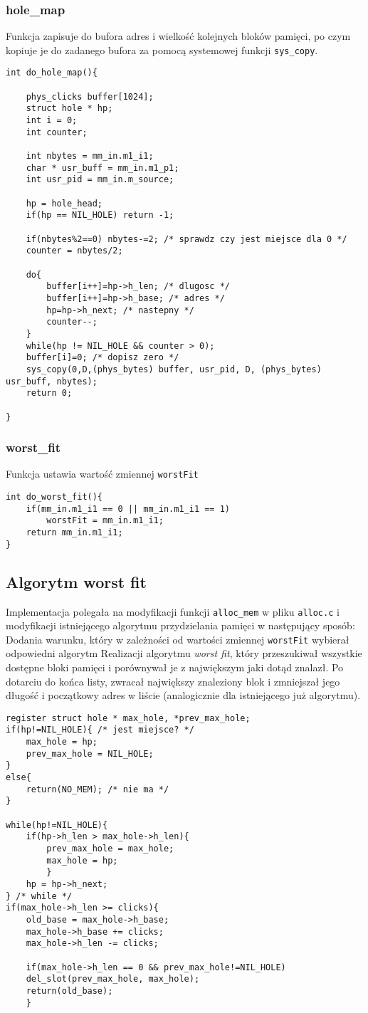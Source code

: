 \documentclass[12pt,a4paper]{article}
\begin{document}
\subsubsection{hole\_map}
Funkcja zapisuje do bufora adres i wielkość kolejnych bloków pamięci, po czym kopiuje je do zadanego bufora za pomocą systemowej funkcji \texttt{sys\_copy}.
\begin{verbatim}
int do_hole_map(){

	phys_clicks buffer[1024];
	struct hole * hp;
	int i = 0;
	int counter; 

	int nbytes = mm_in.m1_i1;
	char * usr_buff = mm_in.m1_p1;
	int usr_pid = mm_in.m_source;

	hp = hole_head;
	if(hp == NIL_HOLE) return -1;

	if(nbytes%2==0) nbytes-=2; /* sprawdz czy jest miejsce dla 0 */
	counter = nbytes/2;

	do{
		buffer[i++]=hp->h_len; /* dlugosc */
		buffer[i++]=hp->h_base; /* adres */
		hp=hp->h_next; /* nastepny */
		counter--;
	}
	while(hp != NIL_HOLE && counter > 0);
	buffer[i]=0; /* dopisz zero */
	sys_copy(0,D,(phys_bytes) buffer, usr_pid, D, (phys_bytes) usr_buff, nbytes);
	return 0;

}
\end{verbatim}
\subsubsection{worst\_fit} 
Funkcja ustawia wartość zmiennej \texttt{worstFit}
\begin{verbatim}
int do_worst_fit(){
	if(mm_in.m1_i1 == 0 || mm_in.m1_i1 == 1)
		worstFit = mm_in.m1_i1;
	return mm_in.m1_i1;
}
\end{verbatim}
\subsection{Algorytm worst fit}
Implementacja polegała na modyfikacji funkcji \texttt{alloc\_mem} w pliku \texttt{alloc.c} i modyfikacji istniejącego algorytmu przydzielania pamięci w następujący sposób:
Dodania warunku, który w zależności od wartości zmiennej \texttt{worstFit} wybierał odpowiedni algorytm
Realizacji algorytmu \emph{worst fit}, który przeszukiwał wszystkie dostępne bloki pamięci i porównywał je z największym jaki dotąd znalazł. Po dotarciu do końca listy, zwracał największy znaleziony blok i zmniejszał jego długość i początkowy adres w liście (analogicznie dla istniejącego już algorytmu).
\begin{verbatim}
register struct hole * max_hole, *prev_max_hole;
if(hp!=NIL_HOLE){ /* jest miejsce? */
	max_hole = hp;
	prev_max_hole = NIL_HOLE;
}
else{
	return(NO_MEM); /* nie ma */
}

while(hp!=NIL_HOLE){
	if(hp->h_len > max_hole->h_len){
		prev_max_hole = max_hole;
		max_hole = hp;
		}
	hp = hp->h_next;
} /* while */
if(max_hole->h_len >= clicks){
	old_base = max_hole->h_base;
	max_hole->h_base += clicks;
	max_hole->h_len -= clicks;

	if(max_hole->h_len == 0 && prev_max_hole!=NIL_HOLE)
	del_slot(prev_max_hole, max_hole);
	return(old_base);
	}
\end{verbatim}
\end{document}
